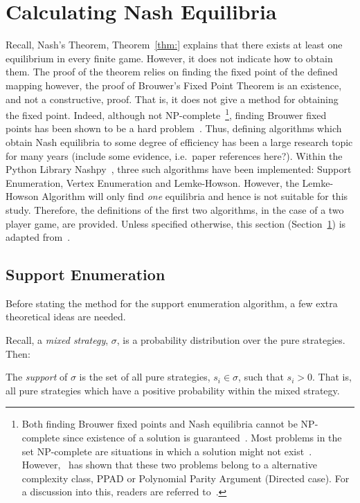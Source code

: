 \section{Calculating Nash Equilibria}\label{sec:Calculating_Nash_Equilibria}
Recall, Nash's Theorem, Theorem~\ref{thm:}
explains that there exists at least one equilibrium in every finite game.
However, it does not indicate how to obtain them. The proof of the theorem
relies on finding the fixed point of the defined mapping however, the proof of
Brouwer's Fixed Point Theorem is an existence, and not a constructive, proof.
That is, it does not give a method for obtaining the fixed point. Indeed,
although not NP-complete~\footnote{Both finding Brouwer fixed points and Nash
equilibria cannot be NP-complete since existence of a solution is
guaranteed~\cite{NoamNisan2007}. Most problems in the set NP-complete are situations in which
a solution might not exist~\cite{NoamNisan2007}. However,~\cite{papadimitriou1994complexity} has shown that these two
problems belong to a alternative complexity class, PPAD or Polynomial Parity
Argument (Directed case). For a discussion into this, readers are referred to~\cite{papadimitriou1994complexity}.}, finding Brouwer fixed points has been shown to be a 
hard problem~\cite{papadimitriou1994complexity, Hirsch1989}. Thus, defining algorithms which obtain Nash equilibria to
some degree of efficiency has been a large research topic for many years
(include some evidence, i.e.\ paper references here?). Within the Python Library Nashpy~\cite{axelrodproject}, three such algorithms have been
implemented: Support Enumeration, Vertex Enumeration and Lemke-Howson. However,
the Lemke-Howson Algorithm will only find \emph{one} equilibria and hence is not
suitable for this study. Therefore, the definitions of the first two algorithms,
in the case of a two player game, are provided. Unless specified otherwise, this
section (Section~\ref{sec:Calculating_Nash_Equilibria}) is adapted from~\cite{NoamNisan2007}.



\subsection{Support Enumeration}\label{subsec:Support_Enumeration}
Before stating the method for the support enumeration algorithm, a few extra
theoretical ideas are needed. 

Recall, a \textit{mixed strategy}, \(\sigma \), is a probability distribution
over the pure strategies. Then:
\begin{definition}
    The \emph{support} of \(\sigma \) is the set of all pure strategies, \(s_{i}
    \in \sigma \), such that \(s_{i} > 0\). That is, all pure strategies which
    have a positive probability within the mixed strategy.
\end{definition}

